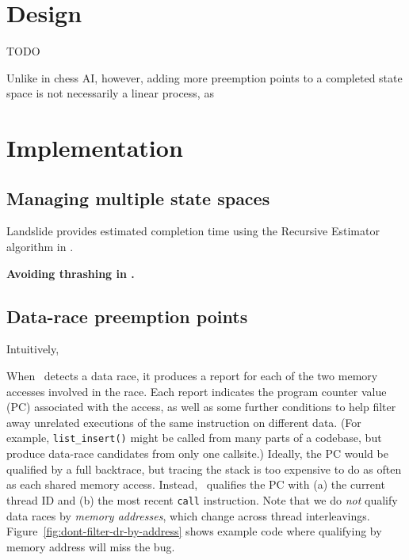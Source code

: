 \section{Design}

TODO

Unlike in chess AI, however, adding more preemption points to a completed state space is not necessarily a linear process, as  %



\section{Implementation}


\subsection{Managing multiple state spaces}

Landslide provides estimated completion time using the Recursive Estimator algorithm in \cite{estimation}.

{\bf Avoiding thrashing in \quicksand.} %


\subsection{Data-race preemption points}

Intuitively, %

When \landslide~detects a data race, it produces a report for each of the two memory accesses involved in the race.
Each report indicates the program counter value (PC) associated with the access, as well as some further conditions to help filter away unrelated executions of the same instruction on different data.
(For example, {\tt list\_insert()} might be called from many parts of a codebase, but produce data-race candidates from only one callsite.)
Ideally, the PC would be qualified by a full backtrace, but tracing the stack is too expensive to do as often as each shared memory access.
Instead, \landslide~qualifies the PC with
(a) the current thread ID and
(b) the most recent {\tt call} instruction.
Note that we do {\em not} qualify data races by {\em memory addresses},
which change across thread interleavings.
Figure~\ref{fig:dont-filter-dr-by-address} shows example code where qualifying by memory address will miss the bug.

